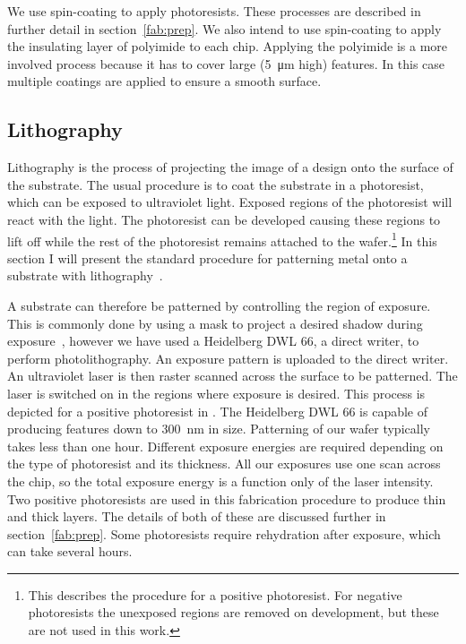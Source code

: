 We use spin-coating to apply photoresists. These processes are described in
further detail in section~\ref{fab:prep}. We also intend to use spin-coating
to apply the insulating layer of polyimide to each chip. Applying the
polyimide is a more involved process because it has to cover large
(\SI{5}{\micro\meter} high) features. In this case multiple coatings are
applied to ensure a smooth surface. 

\subsection{Lithography}

Lithography is the process of projecting the image of a design onto the surface
of the substrate. The usual procedure is to coat the substrate in a
photoresist, which can be exposed to ultraviolet light. Exposed regions of the
photoresist will react with the light. The photoresist can be developed causing
these regions to lift off while the rest of the photoresist remains attached to
the wafer.\footnote{This describes the procedure for a positive photoresist.
For negative photoresists the unexposed regions are removed on development, but
these are not used in this work.} In this section I will present the standard
procedure for patterning metal onto a substrate with
lithography~\cite{Madou2002}.

A substrate can therefore be patterned by controlling the region of exposure.
This is commonly done by using a mask to project a desired shadow during
exposure~\cite{Madou2002}, however we have used a Heidelberg DWL 66, a direct
writer, to perform photolithography.   An exposure
pattern is uploaded to the direct writer. An ultraviolet laser is then raster
scanned across the surface to be patterned. The laser is switched on in the
regions where exposure is desired. This process is depicted for a positive
photoresist in . The Heidelberg DWL 66 is capable
of producing features down to \SI{300}{\nano\meter} in size.  Patterning of our
wafer typically takes less than one hour.  Different exposure energies are
required depending on the type of photoresist and its thickness. All our
exposures use one scan across the chip, so the total exposure energy is a
function only of the laser intensity.   Two
positive photoresists are used in this fabrication procedure to produce thin
and thick layers. The details of both of these are discussed further in
section~\ref{fab:prep}. Some photoresists require rehydration after exposure,
which can take several hours.

